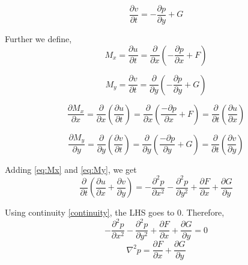 \documentclass{article}
\begin{document}
\begin{equation}
    \frac{\partial v}{\partial t} = -\frac{\partial p}{\partial y} + G
\end{equation}

Further we define,\\

\begin{equation}
   M_{x} = \frac{\partial u}{\partial t} = \frac{\partial }{\partial x}(-\frac{\partial p}{\partial x} + F)
\end{equation}

\begin{equation}
   M_{y} = \frac{\partial v}{\partial t} = \frac{\partial }{\partial y}(-\frac{\partial p}{\partial y} + G)
\end{equation}

\begin{equation} \label{eq:Mx}
\frac{\partial M_{x}}{\partial x} = \frac{\partial }{\partial x}(\frac{\partial u}{\partial t}) = \frac{\partial }{\partial x}(\frac{-\partial p}{\partial x} + F) = \frac{\partial }{\partial t}(\frac{\partial u}{\partial x})
\end{equation}

\begin{equation} \label{eq:My}
\frac{\partial M_{y}}{\partial y} = \frac{\partial }{\partial y}(\frac{\partial v}{\partial t}) = \frac{\partial }{\partial y}(\frac{-\partial p}{\partial y} + G) = \frac{\partial }{\partial t}(\frac{\partial v}{\partial y})
\end{equation}

Adding \ref{eq:Mx} and \ref{eq:My}, we get
\begin{equation}
    \frac{\partial }{\partial t}(\frac{\partial u}{\partial x} + \frac{\partial v}{\partial y}) = -\frac{\partial^2 p}{\partial x^2} - \frac{\partial^2 p}{\partial y^2} + \frac{\partial F}{\partial x} + \frac{\partial G}{\partial y} 
\end{equation}

Using continuity \ref{continuity}, the LHS goes to 0. Therefore,
\begin{equation}
- \frac{\partial^2 p}{\partial x^2} - \frac{\partial^2 p}{\partial y^2} + \frac{\partial F}{\partial x} + \frac{\partial G}{\partial y} = 0
\end{equation}
\begin{equation} \label{eq:poisson}
\nabla^2 p = \frac{\partial F}{\partial x} + \frac{\partial G}{\partial y} 
\end{equation}
\end{document}
